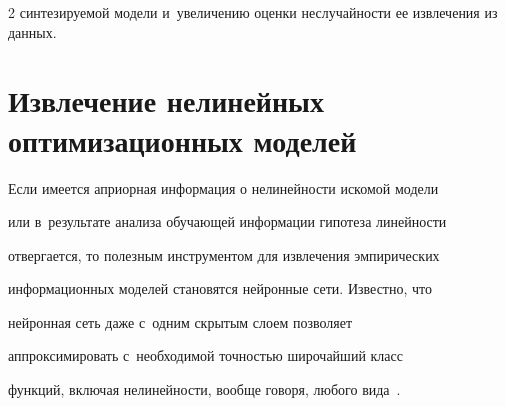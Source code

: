 \begin{multicols}{2}
синтезируемой модели и~увеличению оценки неслучайности ее извлечения из данных.





\vspace*{-6pt}





\section{Извлечение нелинейных оптимизационных моделей}





\renewcommand{\figurename}{\protect\bf Рис.}


\setcounter{figure}{1}











Если имеется априорная информация о нелинейности искомой модели 


или в~результате анализа обучающей информации гипотеза линейности 


отвергается, то полезным инструментом для извлечения эмпирических 


информационных моделей становятся  нейронные сети. Известно, что 


нейронная сеть даже с~одним скрытым слоем позволяет 


аппроксимировать с~необходимой точностью широчайший класс 


функций, включая нелинейности, вообще говоря, любого вида~\cite{13-don}.





 \renewcommand{\figurename}{\protect\bf Алгоритм}


\setcounter{figure}{1}





\begin{figure}


\vspace*{-6pt}




\vspace*{2ex}






\end{figure}
\end{multicols}

